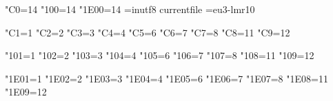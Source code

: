 

\ifx\kcatcode\undefined\else
  \kcatcode"C0=14  %
  \kcatcode"100=14 %
  \kcatcode"1E00=14 %
\fi
\ifx\ocp\undefined\else
  \ocp\ORGin=inutf8
  \InputTranslation currentfile \ORGin
\fi
\font\x=eu3-lmr10 \x
\parindent0pt

\catcode"C1=1
\catcode"C2=2
\catcode"C3=3
\catcode"C4=4
\catcode"C5=6
\catcode"C6=7
\catcode"C7=8
\catcode"C8=11
\catcode"C9=12
\immediate{}%
\immediate{}%
\immediate{}%
\immediate{}%
\immediate{}%
\immediate{}%
\immediate{}%
\immediate{}%

\catcode"101=1
\catcode"102=2
\catcode"103=3
\catcode"104=4
\catcode"105=6
\catcode"106=7
\catcode"107=8
\catcode"108=11
\catcode"109=12
\immediate{}%
\immediate{}%
\immediate{}%
\immediate{}%
\immediate{}%
\immediate{}%
\immediate{}%
\immediate{}%

\catcode"1E01=1
\catcode"1E02=2
\catcode"1E03=3
\catcode"1E04=4
\catcode"1E05=6
\catcode"1E06=7
\catcode"1E07=8
\catcode"1E08=11
\catcode"1E09=12
\immediate{}%
\immediate{}%
\immediate{}%
\immediate{}%
\immediate{}%
\immediate{}%
\immediate{}%
\immediate{}%


